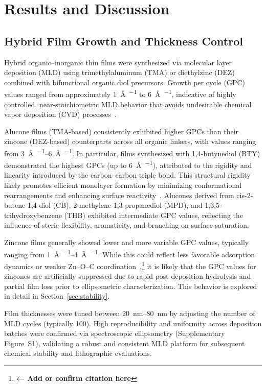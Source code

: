 \section{Results and Discussion}

\subsection{Hybrid Film Growth and Thickness Control}

Hybrid organic--inorganic thin films were synthesized via molecular layer deposition (MLD) using trimethylaluminum (TMA) or diethylzinc (DEZ) combined with bifunctional organic diol precursors. Growth per cycle (GPC) values ranged from approximately \SI{1}{\angstrom\per\cycle} to \SI{6}{\angstrom\per\cycle}, indicative of highly controlled, near-stoichiometric MLD behavior that avoids undesirable chemical vapor deposition (CVD) processes~\cite{Wang2022}.

Alucone films (TMA-based) consistently exhibited higher GPCs than their zincone (DEZ-based) counterparts across all organic linkers, with values ranging from \SIrange{3}{6}{\angstrom\per\cycle}. In particular, films synthesized with 1,4-butynediol (BTY) demonstrated the highest GPCs (up to \SI{6}{\angstrom\per\cycle}), attributed to the rigidity and linearity introduced by the carbon--carbon triple bond. This structural rigidity likely promotes efficient monolayer formation by minimizing conformational rearrangements and enhancing surface reactivity~\cite{Smith2023}. Alucones derived from cis-2-butene-1,4-diol (CB), 2-methylene-1,3-propanediol (MPD), and 1,3,5-trihydroxybenzene (THB) exhibited intermediate GPC values, reflecting the influence of steric flexibility, aromaticity, and branching on surface saturation.

Zincone films generally showed lower and more variable GPC values, typically ranging from \SIrange{1}{4}{\angstrom\per\cycle}. While this could reflect less favorable adsorption dynamics or weaker Zn--O--C coordination~\cite{Zhao2023},\footnote{\textbf{← Add or confirm citation here}} it is likely that the GPC values for zincones are artificially suppressed due to rapid post-deposition hydrolysis and partial film loss prior to ellipsometric characterization. This behavior is explored in detail in Section~\ref{sec:stability}.

Film thicknesses were tuned between \SIrange{20}{80}{\nano\meter} by adjusting the number of MLD cycles (typically 100). High reproducibility and uniformity across deposition batches were confirmed via spectroscopic ellipsometry (Supplementary Figure~S1), validating a robust and consistent MLD platform for subsequent chemical stability and lithographic evaluations.



